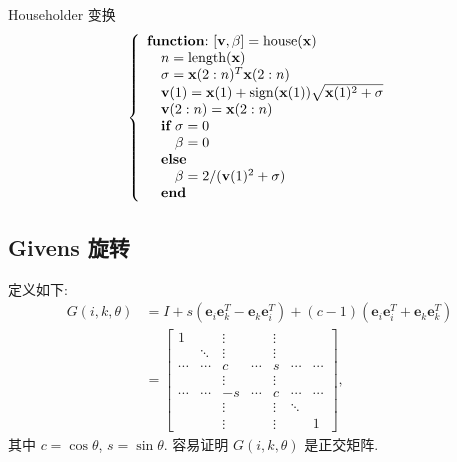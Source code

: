 \begin{algorithm}{Householder 变换}
\label{alg:4-1}
\[
  \left\{
  \begin{array}{l}
    \text{\textbf{function}:}\ [\mathbf{v},\beta]=\text{house}(\mathbf{x})\\
    \quad n=\text{length}(\mathbf{x})\\
    \quad\sigma=\mathbf{x}(2:n)^T\mathbf{x}(2:n)\\
    \quad\mathbf{v}(1)=\mathbf{x}(1)+\sign(\mathbf{x}(1))
      \sqrt{\mathbf{x}(1)^2+\sigma}\\
    \quad\mathbf{v}(2:n)=\mathbf{x}(2:n)\\
    \quad\textbf{if}\ \sigma=0\\
    \quad\quad\beta=0\\
    \quad\textbf{else}\\
    \quad\quad\beta=2/(\mathbf{v}(1)^2+\sigma)\\
    \quad\textbf{end}
  \end{array}
  \right.
\]
\end{algorithm}

\subsection{Givens 旋转}
\label{subsec:4-2-2}

定义如下:
\[
  \begin{aligned}
    G(i,k,\theta)
    &=I+s(\mathbf{e}_i\mathbf{e}_k^T-\mathbf{e}_k\mathbf{e}_i^T)
      +(c-1)(\mathbf{e}_i\mathbf{e}_i^T+\mathbf{e}_k\mathbf{e}_k^T)\\
    &=
    \begin{bmatrix}
      1      &        & \vdots &        & \vdots &        &        \\
             & \ddots & \vdots &        & \vdots &        &        \\
      \cdots & \cdots & c      & \cdots & s      & \cdots & \cdots \\
             &        & \vdots &        & \vdots &        &        \\
      \cdots & \cdots & -s     & \cdots & c      & \cdots & \cdots \\
             &        & \vdots &        & \vdots & \ddots &        \\
             &        & \vdots &        & \vdots &        & 1
    \end{bmatrix},
  \end{aligned}
\]
其中 $c=\cos\theta$, $s=\sin\theta$. 容易证明 $G(i,k,\theta)$ 是正交矩阵.

